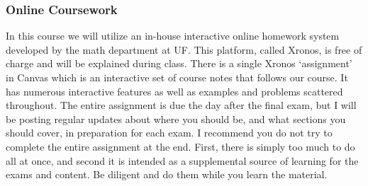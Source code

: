 \documentclass{ximeraXloud}
\begin{document}
    \subsubsection*{Online Coursework}
    In this course we will utilize an in-house interactive online homework system developed by the math department at UF. This platform, called Xronos, is free of charge and will be explained during class. There is a single Xronos `assignment' in Canvas which is an interactive set of course notes that follows our course. It has numerous interactive features as well as examples and problems scattered throughout. The entire assignment is due the day after the final exam, but I will be posting regular updates about where you should be, and what sections you should cover, in preparation for each exam. I recommend you do  not try to complete the entire assignment at the end. First, there is simply too much to do all at once, and second it is intended as a supplemental source of learning for the exams and content. Be diligent and do them while you learn the material.\\
    
\end{document}
